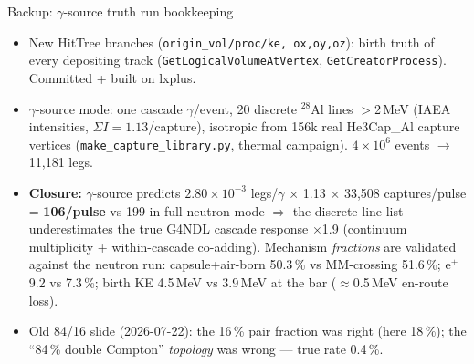\documentclass[aspectratio=169,11pt]{beamer}
\begin{document}
\begin{frame}{Backup: $\gamma$-source truth run bookkeeping}
  \small
  \begin{itemize}
    \item New HitTree branches (\texttt{origin\_vol/proc/ke, ox,oy,oz}):
          birth truth of every depositing track
          (\texttt{GetLogicalVolumeAtVertex}, \texttt{GetCreatorProcess}).
          Committed + built on lxplus.
    \item $\gamma$-source mode: one cascade $\gamma$/event, 20 discrete
          $^{28}$Al lines $>$2\,MeV (IAEA intensities, $\Sigma I=1.13$/capture),
          isotropic from 156k real He3Cap\_Al capture vertices
          (\texttt{make\_capture\_library.py}, thermal campaign).
          $4\times10^{6}$ events $\to$ 11{,}181 legs.
    \item \textbf{Closure:} $\gamma$-source predicts
          $2.80\times10^{-3}$ legs/$\gamma$ $\times$ 1.13 $\times$ 33{,}508
          captures/pulse = \textbf{106/pulse} vs 199 in full neutron mode
          $\Rightarrow$ the discrete-line list underestimates the true G4NDL
          cascade response $\times$1.9 (continuum multiplicity +
          within-cascade co-adding). Mechanism \emph{fractions} are
          validated against the neutron run: capsule+air-born 50.3\,\% vs
          MM-crossing 51.6\,\%; e$^+$ 9.2 vs 7.3\,\%; birth KE 4.5\,MeV vs
          3.9\,MeV at the bar ($\approx$0.5\,MeV en-route loss).
    \item Old 84/16 slide (2026-07-22): the 16\,\% pair fraction was right
          (here 18\,\%); the ``84\,\% double Compton'' \emph{topology} was
          wrong --- true rate 0.4\,\%.
  \end{itemize}
\end{frame}
\end{document}
